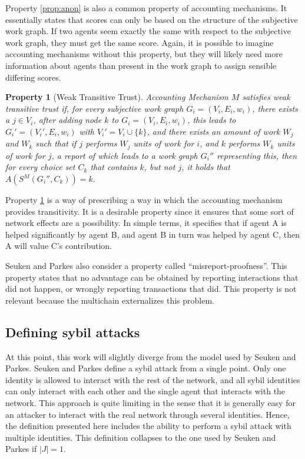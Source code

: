 \documentclass[a4paper,11pt]{book}
\newtheorem{property}{Property}
\theoremstyle{definition}
\begin{document}
Property \ref{prop:anon} is also a common property of accounting mechanisms. It essentially states that
scores can only be based on the structure of the subjective work graph. If two agents seem exactly the
same with respect to the subjective work graph, they must get the same score. Again, it is possible
to imagine accounting mechanisms without this property, but they will likely need more information
about agents than present in the work graph to assign sensible differing scores.


\begin{property}[Weak Transitive Trust]
    Accounting Mechanism $M$ satisfies weak transitive trust if, for every subjective work graph 
    $G_i = (V_i, E_i, w_i)$, there exists a $j \in V_i$, after adding node $k$ to $G_i = (V_i, E_i, w_i)$,
    this leads to $G_i' = (V_i', E_i, w_i)$ with $V_i' = V_i \cup \{k\}$, and there exists an amount 
    of work $W_j$ and $W_k$ such that if $j$ performs $W_j$ units of work for $i$, and $k$ performs
    $W_k$ units of work for $j$, a report of which leads to a work graph $G_i''$ representing this,
    then for every choice set $C_k$ that contains $k$, but not $j$, it holds that $A(S^M(G_i'', C_k)) = k$.
    \label{prop:wtt}
\end{property}

Property \ref{prop:wtt} is a way of prescribing a way in which the accounting mechanism provides transitivity.
It is a desirable property since it ensures that some sort of network effects are a possibility.
In simple terms, it specifies that if agent A is helped significantly by agent B, and agent B in turn
was helped by agent C, then A will value C's contribution.

Seuken and Parkes also consider a property called ``misreport-proofness''. This property
states that no advantage can be obtained by reporting interactions that did not happen,
or wrongly reporting transactions that did. This property is not relevant because
the multichain externalizes this problem. 

\subsection{Defining sybil attacks}

At this point, this work will slightly diverge from the model used by Seuken and Parkes. 
Seuken and Parkes define a sybil attack from a single point. Only one identity is allowed
to interact with the rest of the network, and all sybil identities can only interact with
each other and the single agent that interacts with the network. This approach is quite
limiting in the sense that it is generally easy for an attacker to interact with the 
real network through several identities. Hence, the definition presented here
includes the ability to perform a sybil attack with multiple identities. This definition
collapses to the one used by Seuken and Parkes if $|J|=1$.
\end{document}

